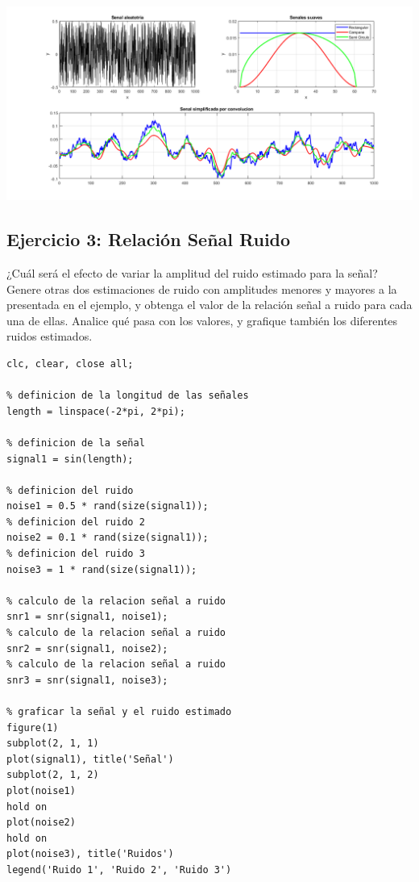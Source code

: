 \documentclass{article}
\begin{document}
\begin{minipage}{\linewidth}
  \centering
  \includegraphics[width=1.0\textwidth]{imgs/p2.png}
  \label{referenciarImagenAca}
\end{minipage}


\subsection*{Ejercicio 3: Relación Señal Ruido}

¿Cuál será el efecto de variar la amplitud del ruido estimado para la señal? Genere otras dos estimaciones de ruido con amplitudes menores y mayores a la presentada en el ejemplo, y obtenga el valor de la relación señal a ruido para cada una de ellas. Analice qué pasa con los valores, y grafique también los diferentes ruidos estimados.

\begin{lstlisting}[style=mystyle]
clc, clear, close all;

% definicion de la longitud de las señales
length = linspace(-2*pi, 2*pi);

% definicion de la señal
signal1 = sin(length);

% definicion del ruido
noise1 = 0.5 * rand(size(signal1));
% definicion del ruido 2
noise2 = 0.1 * rand(size(signal1));
% definicion del ruido 3
noise3 = 1 * rand(size(signal1));

% calculo de la relacion señal a ruido
snr1 = snr(signal1, noise1);
% calculo de la relacion señal a ruido
snr2 = snr(signal1, noise2);
% calculo de la relacion señal a ruido
snr3 = snr(signal1, noise3);

% graficar la señal y el ruido estimado
figure(1)
subplot(2, 1, 1)
plot(signal1), title('Señal')
subplot(2, 1, 2)
plot(noise1)
hold on
plot(noise2)
hold on
plot(noise3), title('Ruidos')
legend('Ruido 1', 'Ruido 2', 'Ruido 3')
\end{lstlisting}
\end{document}
